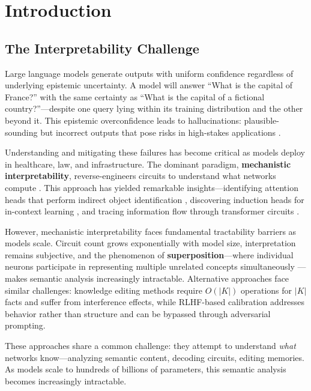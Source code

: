 \documentclass[11pt]{article}
\begin{document}
\section{Introduction}
\label{sec:introduction}

\subsection{The Interpretability Challenge}
\label{sec:intro-challenge}

Large language models generate outputs with uniform confidence regardless of underlying epistemic uncertainty. A model will answer ``What is the capital of France?'' with the same certainty as ``What is the capital of a fictional country?''---despite one query lying within its training distribution and the other beyond it. This epistemic overconfidence leads to hallucinations: plausible-sounding but incorrect outputs that pose risks in high-stakes applications \citep{ji2023survey}.

Understanding and mitigating these failures has become critical as models deploy in healthcare, law, and infrastructure. The dominant paradigm, \textbf{mechanistic interpretability}, reverse-engineers circuits to understand what networks compute \citep{elhage2021mathematical, olah2020zoom}. This approach has yielded remarkable insights---identifying attention heads that perform indirect object identification \citep{wang2023interpretability}, discovering induction heads for in-context learning \citep{olsson2022context}, and tracing information flow through transformer circuits \citep{conmy2023towards}.

However, mechanistic interpretability faces fundamental tractability barriers as models scale. Circuit count grows exponentially with model size, interpretation remains subjective, and the phenomenon of \textbf{superposition}---where individual neurons participate in representing multiple unrelated concepts simultaneously \citep{elhage2022superposition}---makes semantic analysis increasingly intractable. Alternative approaches face similar challenges: knowledge editing methods \citep{meng2022locating, mitchell2022fast} require $O(|K|)$ operations for $|K|$ facts and suffer from interference effects, while RLHF-based calibration \citep{ouyang2022training} addresses behavior rather than structure and can be bypassed through adversarial prompting.

These approaches share a common challenge: they attempt to understand \textit{what} networks know---analyzing semantic content, decoding circuits, editing memories. As models scale to hundreds of billions of parameters, this semantic analysis becomes increasingly intractable.
\end{document}
